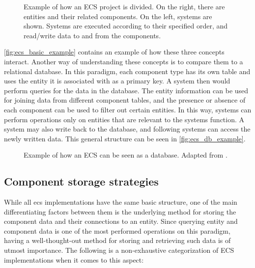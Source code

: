 \documentclass[twoside, 11pt]{article}
\begin{document}
\begin{figure}[h]
  \centering
  
  \caption[Example of how an ECS project is divided]{Example of how an ECS project is divided. On the right, there are entities and their related components. On the left, systems are shown. Systems are executed according to their specified order, and read/write data to and from the components.}
  \label{fig:ecs_basic_example}
\end{figure}

\autoref{fig:ecs_basic_example} contains an example of how these three concepts interact.  Another way of understanding these concepts is to compare them to a relational database. In this paradigm, each component type has its own table and uses the entity it is associated with as a primary key. A system then would perform queries for the data in the database. The entity information can be used for joining data from different component tables, and the presence or absence of each component can be used to filter out certain entities. In this way, systems can perform operations only on entities that are relevant to the systems function. A system may also write back to the database, and following systems can access the newly written data. This general structure can be seen in \autoref{fig:ecs_db_example}.

\begin{figure}
  \centering
  
  \caption[Example of how an ECS can be seen as a database]{Example of how an ECS can be seen as a database. Adapted from \cite{csherratt}.}
  \label{fig:ecs_db_example}
\end{figure}

\subsection{Component storage strategies}

While all \gls{ecs} implementations have the same basic structure, one of the main differentiating factors between them is the underlying method for storing the component data and their connections to an entity. Since querying entity and component data is one of the most performed operations on this paradigm, having a well-thought-out method for storing and retrieving such data is of utmost importance. The following is a non-exhaustive categorization of ECS implementations when it comes to this aspect:
\end{document}
